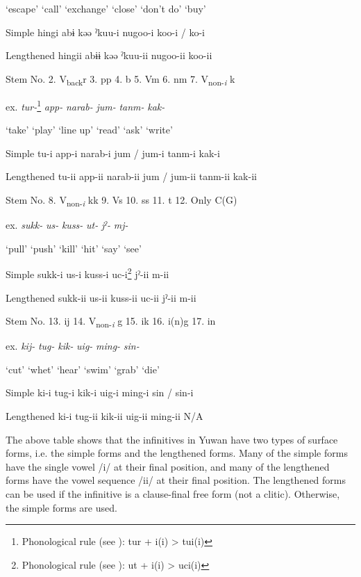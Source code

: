   ‘escape’  ‘call’  ‘exchange’  ‘close’  ‘don’t do’  ‘buy’

Simple  hingi  abɨ  kəə  ˀkuu-i  nugoo-i  koo-i / ko-i

Lengthened  hingii  abɨɨ  kəə  ˀkuu-ii  nugoo-ii  koo-ii

Stem No.  2. V\textsubscript{back}r  3. pp  4. b  5. Vm  6. nm  7. V\textsubscript{non-}\textit{\textsubscript{i} }k

ex.  \textit{tur-}\footnote{Phonological rule (see ): tur + i(i) > tui(i)}  \textit{app-}  \textit{narab-}  \textit{jum-}  \textit{tanm-}  \textit{kak-}

  ‘take’  ‘play’  ‘line up’  ‘read’  ‘ask’  ‘write’

Simple  tu-i  app-i  narab-i  jum / jum-i  tanm-i  kak-i

Lengthened  tu-ii  app-ii  narab-ii  jum / jum-ii  tanm-ii  kak-ii

Stem No.  8. V\textsubscript{non-}\textit{\textsubscript{i} }kk  9. Vs  10. ss  11. t  12. Only C(G)

ex.  \textit{sukk-}  \textit{us-}  \textit{kuss-}  \textit{ut-}  \textit{jˀ-}  \textit{mj-}

  ‘pull’  ‘push’  ‘kill’  ‘hit’  ‘say’  ‘see’

Simple  sukk-i  us-i  kuss-i  uc-i\footnote{Phonological rule (see ): ut + i(i) > uci(i)}  jˀ-ii  m-ii

Lengthened  sukk-ii  us-ii  kuss-ii  uc-ii  jˀ-ii  m-ii

Stem No.  13. ij  14. V\textsubscript{non-}\textit{\textsubscript{i}} g  15. ik  16. i(n)g    17. in

ex.  \textit{kij-}  \textit{tug-}  \textit{kik-}  \textit{uig-}  \textit{ming-}  \textit{sin-}

  ‘cut’  ‘whet’  ‘hear’  ‘swim’  ‘grab’  ‘die’

Simple  ki-i  tug-i  kik-i  uig-i  ming-i  sin / sin-i

Lengthened  ki-i  tug-ii  kik-ii  uig-ii  ming-ii  N/A

The above table shows that the infinitives in Yuwan have two types of surface forms, i.e. the simple forms and the lengthened forms. Many of the simple forms have the single vowel /i/ at their final position, and many of the lengthened forms have the vowel sequence /ii/ at their final position. The lengthened forms can be used if the infinitive is a clause-final free form (not a clitic). Otherwise, the simple forms are used.

